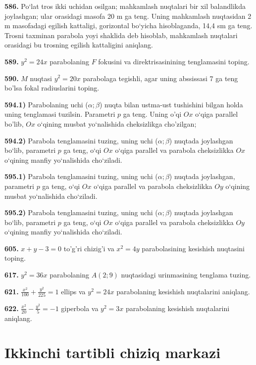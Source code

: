 \textbf{586.} Po‘lat tros ikki uchidan osilgan; mahkamlash nuqtalari bir xil balandlikda joylashgan; ular orasidagi masofa 20 m ga teng. Uning mahkamlash nuqtasidan 2 m masofadagi egilish kattaligi, gorizontal bo‘yicha hisoblaganda, 14,4 sm ga teng. Trosni taxminan parabola yoyi shaklida deb hisoblab, mahkamlash nuqtalari orasidagi bu trosning egilish kattaligini aniqlang.

\textbf{589.} $y^2=24 x$ parabolaning $F$ fokusini va direktrisasinining tenglamasini toping.

\textbf{590.} $M$ nuqtasi $y^2=20 x$ parabolaga tegishli, agar uning abssissasi 7 ga teng bo'lsa fokal radiuslarini toping.

\textbf{594.1)} Parabolaning uchi ($\alpha;\beta$) nuqta bilan ustma-ust tushishini bilgan holda uning tenglamasi tuzilsin. Parametri $p$ ga teng. Uning o'qi $O x$ o‘qiga parallel bo'lib, $O x$ o‘qining musbat yo‘nalishida cheksizlikga cho'zilgan;

\textbf{594.2)} Parabola tenglamasini tuzing, uning uchi ($\alpha; \beta$) nuqtada joylashgan bo‘lib, parametri $p$ ga teng, o‘qi $Ox$ o‘qiga parallel va parabola cheksizlikka $Ox$ o‘qining manfiy yo‘nalishida cho‘ziladi.

\textbf{595.1)} Parabola tenglamasini tuzing, uning uchi ($\alpha; \beta$) nuqtada joylashgan, parametri $p$ ga teng, o‘qi $Ox$ o‘qiga parallel va parabola cheksizlikka $Oy$ o‘qining musbat yo‘nalishida cho‘ziladi.

\textbf{595.2)} Parabola tenglamasini tuzing, uning uchi ($\alpha; \beta$) nuqtada joylashgan bo‘lib, parametri $p$ ga teng, o‘qi $Ox$ o‘qiga parallel va parabola cheksizlikka $Oy$ o‘qining manfiy yo‘nalishida cho‘ziladi.

\textbf{605.} $x+y-3=0$ to'g'ri chizig'i va $x^2=4 y$ parabolasining kesishish nuqtasini toping.

\textbf{617.} $y^2=36 x$ parabolaning $A(2 ; 9)$ nuqtasidagi urinmasining tenglama tuzing.

\textbf{621.} $\frac{x^2}{100}+\frac{y^2}{225}=1$ ellips va $y^2=24 x$ parabolaning kesishish nuqtalarini aniqlang.

\textbf{622.} $\frac{x^2}{20}-\frac{y^2}{5}=-1$ giperbola va $y^2=3 x$ parabolaning kesishish nuqtalarini aniqlang.


\section{Ikkinchi tartibli chiziq markazi}


